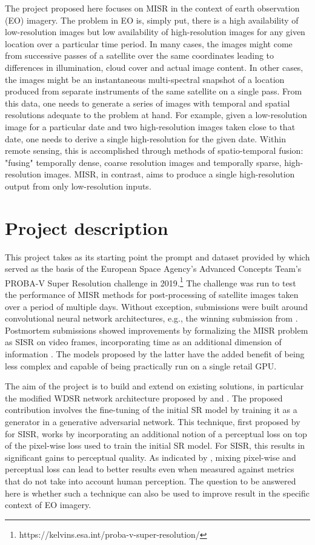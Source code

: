 \documentclass{article}
\begin{document}
The project proposed here focuses on MISR in the context of earth observation (EO) imagery. The problem in EO is, simply put, there is a high availability of low-resolution images but low availability of high-resolution images for any given location over a particular time period. In many cases, the images might come from successive passes of a satellite over the same coordinates leading to differences in illumination, cloud cover and actual image content. In other cases, the images might be an instantaneous multi-spectral snapshot of a location produced from separate instruments of the same satellite on a single pass. From this data, one needs to generate a series of images with temporal and spatial resolutions adequate to the problem at hand. For example, given a low-resolution image for a particular date and two high-resolution images taken close to that date, one needs to derive a single high-resolution for the given date. Within remote sensing, this is accomplished through methods of spatio-temporal fusion: "fusing" temporally dense, coarse resolution images and temporally sparse, high-resolution images. MISR, in contrast, aims to produce a single high-resolution output from only low-resolution inputs.

\section{Project description}

This project takes as its starting point the prompt and dataset provided by \citet{Martens2021} which served as the basis of the European Space Agency's Advanced Concepts Team's PROBA-V Super Resolution challenge in 2019.\footnote{https://kelvins.esa.int/proba-v-super-resolution/} The challenge was run to test the performance of MISR methods for post-processing of satellite images taken over a period of multiple days. Without exception, submissions were built around convolutional neural network architectures, e.g., the winning submission from \citet{Molini2020}. Postmortem submissions showed improvements by formalizing the MISR problem as SISR on video frames, incorporating time as an additional dimension of information \citep*{mark_bajo_2020_3733116,Dorr2020}. The models proposed by the latter have the added benefit of being less complex and capable of being practically run on a single retail GPU.

The aim of the project is to build and extend on existing solutions, in particular the modified WDSR network architecture proposed by \citet{mark_bajo_2020_3733116} and \citet{Dorr2020}. The proposed contribution involves the fine-tuning of the initial SR model by training it as a generator in a generative adversarial network. This technique, first proposed by \citet{Ledig2016} for SISR, works by incorporating an additional notion of a perceptual loss on top of the pixel-wise loss used to train the initial SR model. For SISR, this results in significant gains to perceptual quality. As indicated by \citet{Zhao2017}, mixing pixel-wise and perceptual loss can lead to better results even when measured against metrics that do not take into account human perception. The question to be answered here is whether such a technique can also be used to improve result in the specific context of EO imagery. 
\end{document}

